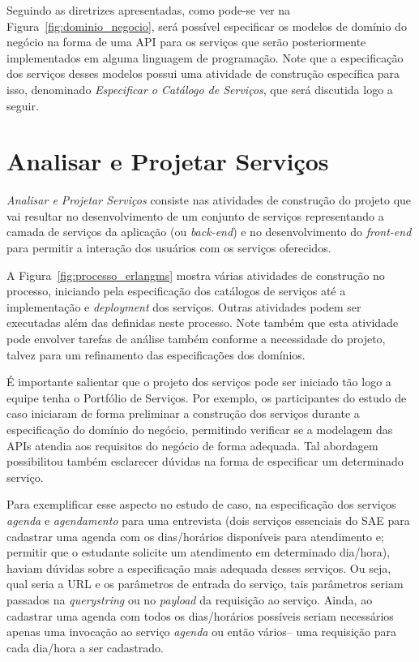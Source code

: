 Seguindo as diretrizes apresentadas,
como pode-se ver na Figura~\ref{fig:dominio_negocio},
será possível especificar 
os modelos de domínio do negócio
na forma de uma \acrfull{API} para os serviços
que serão posteriormente implementados
em alguma linguagem de programação. 
Note que a especificação dos 
serviços desses modelos possui uma atividade
de construção específica para isso,
denominado \emph{Especificar o Catálogo de Serviços},
que será discutida logo a seguir.




\section{Analisar e Projetar Serviços}\label{pro:analisar_projetar}

\emph{Analisar e Projetar Serviços}
consiste nas atividades de construção 
do projeto
que vai resultar no desenvolvimento 
de um conjunto de serviços 
representando a camada de serviços
da aplicação (ou \textit{back-end}) 
e no desenvolvimento do \textit{front-end} 
para permitir a interação dos usuários 
com os serviços oferecidos.

A Figura~\ref{fig:processo_erlangms}
mostra várias atividades de construção
no processo, iniciando pela
especificação dos catálogos de serviços
até a implementação e \textit{deployment}
dos serviços. 
Outras atividades podem
ser executadas além das definidas 
neste processo.
Note também que
esta atividade pode envolver tarefas
de análise também conforme a 
necessidade do projeto, talvez para um 
refinamento das especificações dos domínios.

É importante salientar que
o projeto dos serviços 
pode ser iniciado tão logo a
equipe tenha 
o Portfólio de Serviços. 
Por exemplo, os participantes 
do estudo de caso 
iniciaram de forma preliminar 
a construção dos serviços
durante a especificação do domínio 
do negócio, permitindo
verificar se a modelagem das APIs 
atendia aos requisitos 
do negócio de forma adequada.
Tal abordagem possibilitou também esclarecer 
dúvidas na forma de 
especificar um determinado serviço.

Para exemplificar esse aspecto no estudo de caso,
na especificação dos serviços
\emph{agenda} e \emph{agendamento} 
para uma entrevista (dois serviços 
essenciais do \acrshort{SAE} para cadastrar uma 
agenda com os dias/horários disponíveis 
para atendimento e;
permitir que o estudante solicite
um atendimento em determinado dia/hora),
haviam dúvidas
sobre a especificação mais 
adequada desses serviços. 
Ou seja,
qual seria a URL e os parâmetros de entrada do serviço,
tais parâmetros seriam passados na \textit{querystring} 
ou no \textit{payload} da requisição ao serviço. Ainda,
ao cadastrar uma agenda com todos os dias/horários possíveis
seriam necessários apenas uma invocação ao serviço \emph{agenda}
ou então vários-- uma requisição para cada dia/hora a ser cadastrado. 

